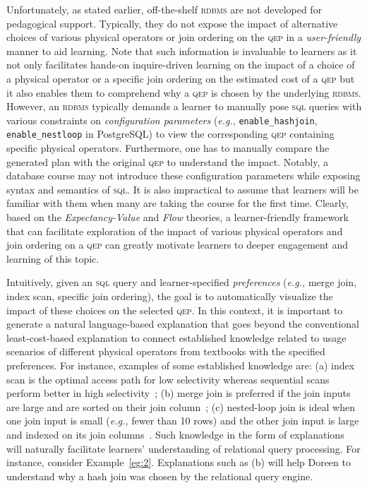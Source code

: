 \documentclass[11pt]{article}
\newcommand{\eg}{\emph{e.g.,}\xspace}
\begin{document}
Unfortunately, as stated earlier, off-the-shelf \textsc{rdbms} are not developed for pedagogical support.  Typically, they do not expose the impact of alternative choices of various physical operators or join ordering on the \textsc{qep} in a \emph{user-friendly} manner to aid learning.  Note that such information is invaluable to learners as it not only facilitates hands-on inquire-driven learning on the impact of a choice of a physical operator  or a specific join ordering on the estimated cost of a \textsc{qep} but it also enables them to comprehend why a \textsc{qep} is chosen by the underlying \textsc{rdbms}. However,  an \textsc{rdbms} typically demands a learner to manually pose \textsc{sql} queries with various constraints on \textit{configuration parameters} (\textit{e.g.}, \texttt{enable\_hashjoin}, \texttt{enable\_nestloop} in PostgreSQL) to view the corresponding \textsc{qep} containing specific physical operators. Furthermore, one has to manually compare the generated plan with the original \textsc{qep} to understand the impact. Notably, a database course may not introduce these configuration parameters while exposing syntax and semantics of \textsc{sql}. It is also impractical to assume that learners will be familiar with them  when many are taking the course for the first time.  Clearly, based on the \textit{Expectancy-Value} and \textit{Flow} theories, a learner-friendly framework that can facilitate exploration of the impact of various physical operators and join ordering on a \textsc{qep} can greatly motivate learners to deeper engagement and learning of this topic. 

Intuitively,  given  an \textsc{sql} query and learner-specified \textit{preferences} (\eg merge join, index scan, specific join ordering), the goal is to automatically visualize the impact of these choices on the selected \textsc{qep}. In this context, it is important to generate a natural language-based explanation that goes beyond the conventional least-cost-based explanation to connect established knowledge related to usage scenarios of different physical operators from textbooks with the specified preferences. For instance, examples of some established knowledge are:  (a) index scan is the optimal access path for low selectivity whereas sequential scans perform better in high selectivity~\cite{borovicaGajic2018}; (b) merge join is preferred if the join inputs are large and are sorted on their join column~\cite{msdn}; (c) nested-loop join is ideal when one join input is small (\eg fewer than 10 rows) and the other join input is large and indexed on its join columns~\cite{msdn}. Such knowledge in the form of explanations will naturally facilitate learners' understanding of relational query processing. For instance, consider Example~\ref{eg:2}. Explanations such as (b) will help Doreen to understand why a hash join was chosen by the relational query engine.
\end{document}
